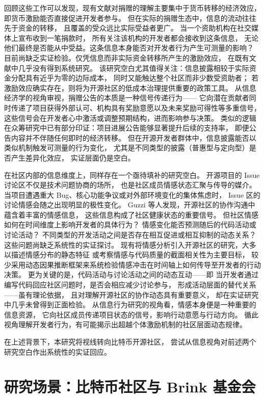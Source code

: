 回顾这些工作可以发现，现有文献对捐赠的理解主要集中于货币转移的经济效应，
即货币激励能否直接促进开发者参与。
但在实际的捐赠生态中，信息的流动往往先于资金的转移，
且覆盖的受众远比实际受益者更广。
当一个资助机构在社交媒体上宣布收到一笔捐款时，
所有关注该机构的开发者都会接收到这条信息，
无论他们最终是否能从中受益。这条信息本身能否对开发者行为产生可测量的影响？
目前尚缺乏实证检验。仅凭信息而非实际资金转移所产生的激励效应，
在既有文献中几乎没有得到系统研究。
该研究空白尤其值得关注：信息披露相较于实际资金分配具有近乎为零的边际成本，
同时又能触达整个社区而非少数受资助者；
若激励效应确实存在，则将为开源社区的低成本治理提供重要的政策工具。
从信息经济学的视角审视，捐赠公告的本质是一种信号传递行为——
它向潜在贡献者同时传递了项目获得外部认可、机构具有奖励意愿以及未来奖励可得性等多重信号，
这些信号会在开发者心中激活或调整预期结构，进而影响参与决策\cite{connelly2011signaling}。
类似的逻辑在众筹研究中已有部分印证：项目进展公告能够显著提升后续的支持率，
即便公告内容并不伴随任何即时的经济转移\cite{mollick2014dynamics}。
但在开源开发者群体中，信息披露能否以类似机制触发可测量的行为变化，
尤其是不同类型的披露（普惠型与定向型）是否产生差异化效应，
实证层面仍是空白。

在社区内部的信息维度上，同样存在一个亟待填补的研究空白。
开源项目的 Issue 讨论区不仅是技术问题协商的场所，
也是社区成员情感状态汇聚与传导的媒介。
当项目遭遇重大 Bug、核心功能争议或对外部环境变化的集体焦虑时，
Issue 区的讨论情感会随之出现明显的极性变化。
Guzzi 等人\cite{guzzi2013}发现，开源社区的协作沟通中蕴含着丰富的情感信息，
这些信息构成了社区健康状态的重要信号。
但社区情感如何在时间维度上影响开发者的具体行为？
情感变化能否预测随后的代码活动或讨论活动？
不同类型的开发活动之间是否存在相互促进或相互抑制的动态关系？
这些问题尚缺乏系统性的实证探讨。
现有将情感分析引入开源社区的研究，大多以描述情感分布的静态特征
或考察情感与代码质量的截面相关性为主要目标\cite{guzzi2013}，
较少采用动态因果推断框架来系统检验情感冲击在时间轴上如何传导至开发者的行动决策。
更为关键的是，代码活动与讨论活动之间的动态互动——即
当开发者通过编写代码回应社区问题时，是否会相应减少讨论参与，
形成活动层面的替代关系——虽有理论依据，
且对理解开源社区的协作动态具有重要意义，
却在实证研究中几乎未曾得到正面检验。
从信息行为研究的视角看，情感本身便是一种重要的信息资源，
它向社区成员传递项目状态的信号，影响行动意愿与行动方向。
循此视角理解开发者行为，有可能揭示出超越个体激励机制的社区层面动态规律。

在上述背景下，本研究将视线转向比特币开源社区，
尝试从信息视角对前述两个研究空白作出系统性的实证回应。

\section{研究场景：比特币社区与 Brink 基金会}

